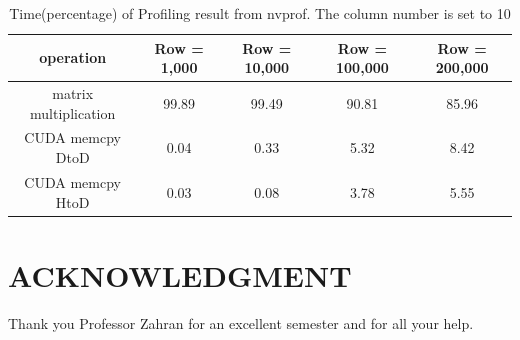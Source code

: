 \documentclass[letterpaper, 10 pt, conference]{ieeeconf}  %
\begin{document}
\begin{table}[h]
\centering
\begin{center}
\begin{tabular}{|c|c|c|c|c|}
\hline
operation & Row = 1,000 & Row = 10,000 & Row = 100,000 & Row = 200,000 \\
\hline
matrix multiplication & 99.89 & 99.49 & 90.81 & 85.96 \\
\hline
CUDA memcpy DtoD & 0.04 & 0.33 & 5.32 & 8.42 \\
\hline
CUDA memcpy HtoD & 0.03 & 0.08 & 3.78 & 5.55 \\
\hline
\end{tabular}
\caption{Time(percentage) of Profiling result from nvprof. The column number is set to 10}
\label{cudaprof}
\end{center}
\end{table}


\addtolength{\textheight}{-12cm}   %



\section*{ACKNOWLEDGMENT}

Thank you Professor Zahran for an excellent semester and for all your help.
\end{document}
